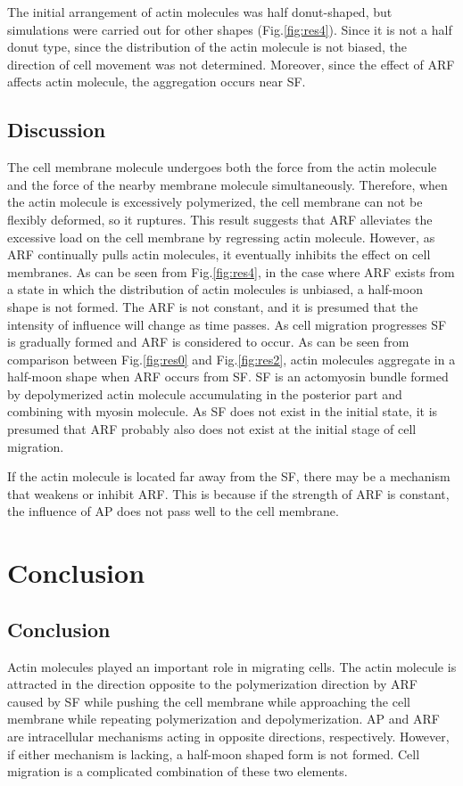 \documentclass[a4paper,12pt, oneside]{book}
\begin{document}
The initial arrangement of actin molecules was half donut-shaped, but simulations were carried out for other shapes (Fig.\ref{fig:res4}). Since it is not a half donut type, since the distribution of the actin molecule is not biased, the direction of cell movement was not determined. Moreover, since the effect of ARF affects actin molecule, the aggregation occurs near SF.

\section{Discussion}
The cell membrane molecule undergoes both the force from the actin molecule and the force of the nearby membrane molecule simultaneously.
Therefore, when the actin molecule is excessively polymerized, the cell membrane can not be flexibly deformed, so it ruptures. 
This result suggests that ARF alleviates the excessive load on the cell membrane by regressing actin molecule.
However, as ARF continually pulls actin molecules, it eventually inhibits the effect on cell membranes.
As can be seen from Fig.\ref{fig:res4}, in the case where ARF exists from a state in which the distribution of actin molecules is unbiased, a half-moon shape is not formed.
The ARF is not constant, and it is presumed that the intensity of influence will change as time passes.
As cell migration progresses SF is gradually formed and ARF is considered to occur.
As can be seen from comparison between Fig.\ref{fig:res0} and Fig.\ref{fig:res2}, actin molecules aggregate in a half-moon shape when ARF occurs from SF.
SF is an actomyosin bundle formed by depolymerized actin molecule accumulating in the posterior part and combining with myosin molecule.
As SF does not exist in the initial state, it is presumed that ARF probably also does not exist at the initial stage of cell migration.

If the actin molecule is located far away from the SF, there may be a mechanism that weakens or inhibit ARF.
This is because if the strength of ARF is constant, the influence of AP does not pass well to the cell membrane.

\chapter{Conclusion}
\section{Conclusion}
Actin molecules played an important role in migrating cells. The actin molecule is attracted in the direction opposite to the polymerization direction by ARF caused by SF while pushing the cell membrane while approaching the cell membrane while repeating polymerization and depolymerization. AP and ARF are intracellular mechanisms acting in opposite directions, respectively. However, if either mechanism is lacking, a half-moon shaped form is not formed. Cell migration is a complicated combination of these two elements.
\end{document}
